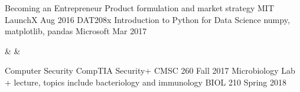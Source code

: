 

\begin{additionaleducation}
  \cvdateitem
    {Becoming an Entrepreneur} %
    {Product formulation and market strategy} %
    {MIT LaunchX} %
    {Aug 2016} %
   \cvdateitem
    {DAT208x Introduction to Python for Data Science} %
    {numpy, matplotlib, pandas} %
    {Microsoft} %
    {Mar 2017} %
\end{additionaleducation}





\begin{additionaleducation}
   &  &  \\
\end{additionaleducation}





\begin{additionaleducation}
  \cvdateitem
    {Computer Security} %
    {CompTIA Security+} %
    {CMSC 260} %
    {Fall 2017} %
   \cvdateitem
    {Microbiology} %
    {Lab + lecture, topics include bacteriology and immunology} %
    {BIOL 210} %
    {Spring 2018} %
\end{additionaleducation}

